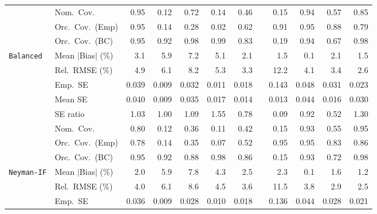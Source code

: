 \begin{landscape}
\begin{longtable}{llrrrrrrrrrr}
 & Nom.\ Cov. & \cellcolor{rankone}0.95 & 0.12 & 0.72 & 0.14 & 0.46 &  & 0.15 & \cellcolor{ranktwo}0.94 & 0.57 & \cellcolor{rankthree}0.85 \\
 & Orc.\ Cov.\ (Emp) & \cellcolor{rankone}0.95 & 0.14 & 0.28 & 0.02 & 0.62 &  & \cellcolor{ranktwo}0.91 & \cellcolor{rankone}0.95 & \cellcolor{rankthree}0.88 & 0.79 \\
 & Orc.\ Cov.\ (BC) & \cellcolor{rankone}0.95 & \cellcolor{rankthree}0.92 & \cellcolor{rankthree}0.98 & 0.99 & 0.83 &  & 0.19 & \cellcolor{ranktwo}0.94 & 0.67 & \cellcolor{rankthree}0.98 \\
\addlinespace[2pt]
\quad \texttt{Balanced} & Mean $|$Bias$|$ (\%) & 3.1 & 5.9 & 7.2 & 5.1 & \cellcolor{rankthree}2.1 &  & \cellcolor{ranktwo}1.5 & \cellcolor{rankone}0.1 & \cellcolor{rankthree}2.1 & \cellcolor{ranktwo}1.5 \\
 & Rel.\ RMSE (\%) & 4.9 & 6.1 & 8.2 & 5.3 & \cellcolor{ranktwo}3.3 &  & 12.2 & 4.1 & \cellcolor{rankthree}3.4 & \cellcolor{rankone}2.6 \\
 & Emp.\ SE & 0.039 & 0.009 & 0.032 & 0.011 & 0.018 &  & 0.143 & 0.048 & 0.031 & 0.023 \\
 & Mean SE & 0.040 & 0.009 & 0.035 & 0.017 & 0.014 &  & 0.013 & 0.044 & 0.016 & 0.030 \\
 & SE ratio & \cellcolor{ranktwo}1.03 & \cellcolor{rankone}1.00 & 1.09 & 1.55 & 0.78 &  & 0.09 & \cellcolor{rankthree}0.92 & 0.52 & 1.30 \\
 & Nom.\ Cov. & \cellcolor{rankthree}0.80 & 0.12 & 0.36 & 0.11 & 0.42 &  & 0.15 & \cellcolor{ranktwo}0.93 & 0.55 & \cellcolor{rankone}0.95 \\
 & Orc.\ Cov.\ (Emp) & 0.78 & 0.14 & 0.35 & 0.07 & 0.52 &  & \cellcolor{rankone}0.95 & \cellcolor{rankone}0.95 & \cellcolor{rankthree}0.83 & \cellcolor{ranktwo}0.86 \\
 & Orc.\ Cov.\ (BC) & \cellcolor{rankone}0.95 & \cellcolor{rankthree}0.92 & 0.88 & \cellcolor{rankthree}0.98 & 0.86 &  & 0.15 & \cellcolor{ranktwo}0.93 & 0.72 & \cellcolor{rankthree}0.98 \\
\addlinespace[2pt]
\quad \texttt{Neyman-IF} & Mean $|$Bias$|$ (\%) & 2.0 & 5.9 & 7.8 & 4.3 & 2.5 &  & 2.3 & \cellcolor{rankone}0.1 & \cellcolor{rankthree}1.6 & \cellcolor{ranktwo}1.2 \\
 & Rel.\ RMSE (\%) & 4.0 & 6.1 & 8.6 & 4.5 & \cellcolor{rankthree}3.6 &  & 11.5 & 3.8 & \cellcolor{ranktwo}2.9 & \cellcolor{rankone}2.5 \\
 & Emp.\ SE & 0.036 & 0.009 & 0.028 & 0.010 & 0.018 &  & 0.136 & 0.044 & 0.028 & 0.021 \\

\end{longtable}
\end{landscape}
